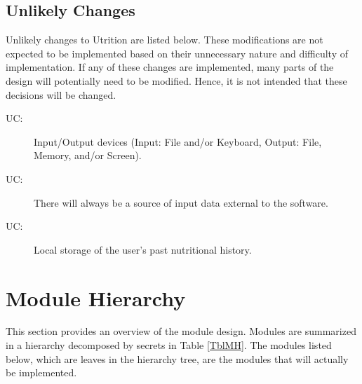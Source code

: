 \documentclass[12pt, titlepage]{article}
\newcounter{ucnum}
\newcommand{\uctheucnum}{UC\theucnum}
\begin{document}
\subsection{Unlikely Changes} \label{SecUchange}

Unlikely changes to Utrition are listed below. These modifications are not expected to be implemented based on their unnecessary nature and difficulty of implementation. If any of these changes are implemented, many parts of the design
will potentially need to be modified. Hence, it is not intended that these
decisions will be changed.

\begin{description}
\item[ \uctheucnum \label{ucIO}:] Input/Output devices
  (Input: File and/or Keyboard, Output: File, Memory, and/or Screen).
\item [ \uctheucnum \label{ucIO}:] There will always be a source of input data external to the software.
\item [ \uctheucnum \label{ucIO}:] Local storage of the user's past nutritional history.
\end{description}

\section{Module Hierarchy} \label{SecMH}

This section provides an overview of the module design. Modules are summarized
in a hierarchy decomposed by secrets in Table \ref{TblMH}. The modules listed
below, which are leaves in the hierarchy tree, are the modules that will
actually be implemented.
\end{document}
